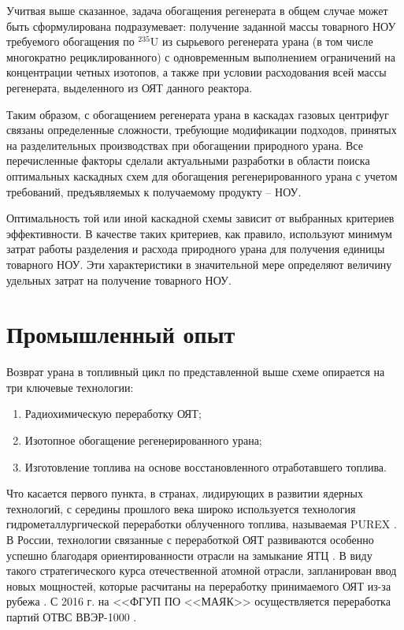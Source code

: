 Учитвая выше сказанное, задача обогащения регенерата в общем случае может быть сформулирована подразумевает: получение заданной массы товарного НОУ требуемого обогащения по $^{235}$U из сырьевого регенерата урана (в том числе многократно рециклированного) с одновременным выполнением ограничений на концентрации четных изотопов, а также при условии расходования всей массы регенерата, выделенного из ОЯТ данного реактора.

Таким образом, с обогащением регенерата урана в каскадах газовых центрифуг связаны определенные сложности, требующие модификации подходов, принятых на разделительных производствах при обогащении природного урана. Все перечисленные факторы сделали актуальными разработки в области поиска оптимальных каскадных схем для обогащения регенерированного урана с учетом требований, предъявляемых к получаемому продукту -- НОУ.

Оптимальность той или иной каскадной схемы зависит от выбранных критериев эффективности. В качестве таких критериев, как правило, используют минимум затрат работы разделения и расхода природного урана для получения единицы товарного НОУ. Эти характеристики в значительной мере определяют величину удельных затрат на получение товарного НОУ.



\section{Промышленный опыт}\label{sec:ch1/sec1}

Возврат урана в топливный цикл по представленной выше схеме опирается на три ключевые технологии:
\begin{enumerate}
  \item Радиохимическую переработку ОЯТ;
  \item Изотопное обогащение регенерированного урана;
  \item Изготовление топлива на основе восстановленного отработавшего топлива.
\end{enumerate}

Что касается первого пункта, в странах, лидирующих в развитии ядерных технологий, с середины прошлого века широко используется технология гидрометаллургической переработки облученного топлива, называемая PUREX \cite{selvaduraySurveyNuclearFuel1979}. В России, технологии связанные с переработкой ОЯТ развиваются особенно успешно благодаря ориентированности отрасли на замыкание ЯТЦ \cite{balihinSostoyaniiPerspektivahRazvitiya2018, efimenkoProblemyPerspektivyRazvitiya2017}. В виду такого стратегического курса отечественной атомной отрасли, запланирован ввод новых мощностей, которые расчитаны на переработку принимаемого ОЯТ из-за рубежа \cite{050519L3942005}. С 2016 г. на <<ФГУП ПО <<МАЯК>> осуществляется переработка партий ОТВС ВВЭР-1000 \cite{PyatyyNacionalnyyDoklad}.

